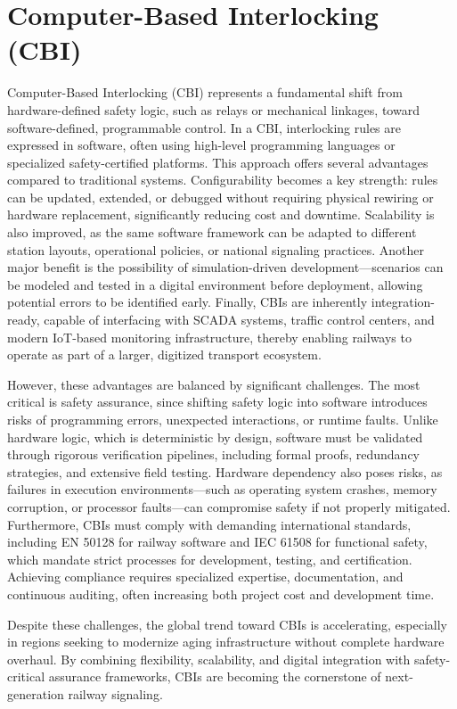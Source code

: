 \section{Computer-Based Interlocking (CBI)}

Computer-Based Interlocking (CBI) represents a fundamental shift from hardware-defined safety logic, such as relays or mechanical linkages, toward software-defined, programmable control. In a CBI, interlocking rules are expressed in software, often using high-level programming languages or specialized safety-certified platforms. This approach offers several advantages compared to traditional systems. Configurability becomes a key strength: rules can be updated, extended, or debugged without requiring physical rewiring or hardware replacement, significantly reducing cost and downtime. Scalability is also improved, as the same software framework can be adapted to different station layouts, operational policies, or national signaling practices. Another major benefit is the possibility of simulation-driven development—scenarios can be modeled and tested in a digital environment before deployment, allowing potential errors to be identified early. Finally, CBIs are inherently integration-ready, capable of interfacing with SCADA systems, traffic control centers, and modern IoT-based monitoring infrastructure, thereby enabling railways to operate as part of a larger, digitized transport ecosystem.

However, these advantages are balanced by significant challenges. The most critical is safety assurance, since shifting safety logic into software introduces risks of programming errors, unexpected interactions, or runtime faults. Unlike hardware logic, which is deterministic by design, software must be validated through rigorous verification pipelines, including formal proofs, redundancy strategies, and extensive field testing. Hardware dependency also poses risks, as failures in execution environments—such as operating system crashes, memory corruption, or processor faults—can compromise safety if not properly mitigated. Furthermore, CBIs must comply with demanding international standards, including EN 50128 for railway software and IEC 61508 for functional safety, which mandate strict processes for development, testing, and certification. Achieving compliance requires specialized expertise, documentation, and continuous auditing, often increasing both project cost and development time.

Despite these challenges, the global trend toward CBIs is accelerating, especially in regions seeking to modernize aging infrastructure without complete hardware overhaul. By combining flexibility, scalability, and digital integration with safety-critical assurance frameworks, CBIs are becoming the cornerstone of next-generation railway signaling.